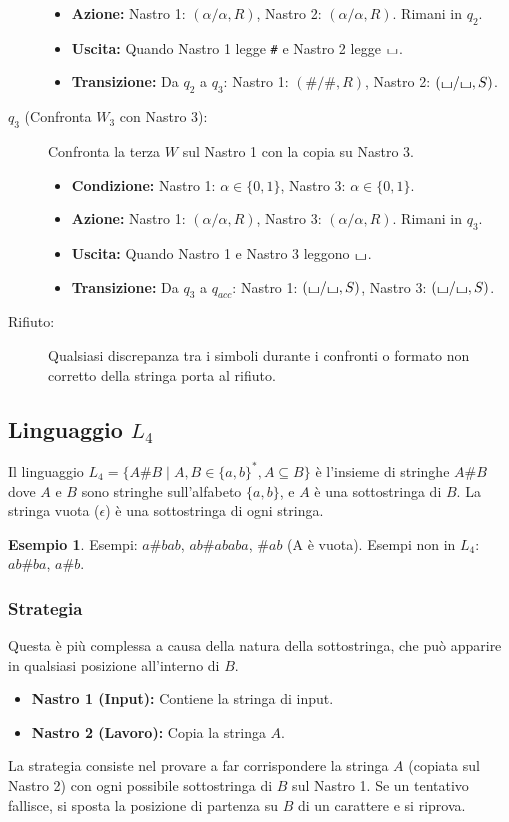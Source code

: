 \documentclass[a4paper]{article}
\theoremstyle{definition} %
\newtheorem{example}{Esempio}
\newcommand{\blankS}{\ensuremath{\raisebox{-0.15ex}{\scalebox{1.3}[0.7]{$\sqcup$}}}}
\begin{document}
\begin{description}
\begin{itemize}
        \item \textbf{Azione:} Nastro 1: $(\alpha/\alpha, R)$, Nastro 2: $(\alpha/\alpha, R)$. Rimani in $q_2$.
        \item \textbf{Uscita:} Quando Nastro 1 legge \texttt{\#} e Nastro 2 legge $\blankS$.
        \item \textbf{Transizione:} Da $q_2$ a $q_3$: Nastro 1: $(\#/\#, R)$, Nastro 2: $(\blankS/\blankS, S)$.
    \end{itemize}
    \item[$q_3$ (Confronta $W_3$ con Nastro 3):] Confronta la terza $W$ sul Nastro 1 con la copia su Nastro 3.
    \begin{itemize}
        \item \textbf{Condizione:} Nastro 1: $\alpha \in \{0,1\}$, Nastro 3: $\alpha \in \{0,1\}$.
        \item \textbf{Azione:} Nastro 1: $(\alpha/\alpha, R)$, Nastro 3: $(\alpha/\alpha, R)$. Rimani in $q_3$.
        \item \textbf{Uscita:} Quando Nastro 1 e Nastro 3 leggono $\blankS$.
        \item \textbf{Transizione:} Da $q_3$ a $q_{acc}$: Nastro 1: $(\blankS/\blankS, S)$, Nastro 3: $(\blankS/\blankS, S)$.
    \end{itemize}
    \item[Rifiuto:] Qualsiasi discrepanza tra i simboli durante i confronti o formato non corretto della stringa porta al rifiuto.
\end{description}

\subsection{Linguaggio $L_4$}
Il linguaggio $L_4 = \{A\#B \mid A,B \in \{a,b\}^*, A \subseteq B \}$ è l'insieme di stringhe $A\#B$ dove $A$ e $B$ sono stringhe sull'alfabeto $\{a,b\}$, e $A$ è una sottostringa di $B$. La stringa vuota ($\epsilon$) è una sottostringa di ogni stringa.
\begin{example}
Esempi: $a\#bab$, $ab\#ababa$, $\#ab$ (A è vuota).
Esempi non in $L_4$: $ab\#ba$, $a\#b$.
\end{example}

\subsubsection{Strategia}
Questa è più complessa a causa della natura della sottostringa, che può apparire in qualsiasi posizione all'interno di $B$.
\begin{itemize}
    \item \textbf{Nastro 1 (Input):} Contiene la stringa di input.
    \item \textbf{Nastro 2 (Lavoro):} Copia la stringa $A$.
\end{itemize}
La strategia consiste nel provare a far corrispondere la stringa $A$ (copiata sul Nastro 2) con ogni possibile sottostringa di $B$ sul Nastro 1. Se un tentativo fallisce, si sposta la posizione di partenza su $B$ di un carattere e si riprova.
\end{document}
